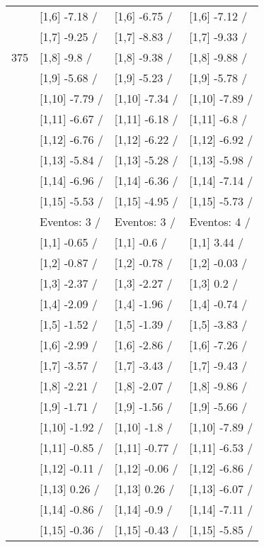 \begin{table}
\begin{tabular}[t]{llll}
 & {}[1,6] -7.18  / & {}[1,6] -6.75  / & {}[1,6] -7.12  /\\
 & {}[1,7] -9.25  / & {}[1,7] -8.83  / & {}[1,7] -9.33  /\\
375 & {}[1,8] -9.8  / & {}[1,8] -9.38  / & {}[1,8] -9.88  /\\
\addlinespace
 & {}[1,9] -5.68  / & {}[1,9] -5.23  / & {}[1,9] -5.78  /\\
 & {}[1,10] -7.79  / & {}[1,10] -7.34  / & {}[1,10] -7.89  /\\
 & {}[1,11] -6.67  / & {}[1,11] -6.18  / & {}[1,11] -6.8  /\\
 & {}[1,12] -6.76  / & {}[1,12] -6.22  / & {}[1,12] -6.92  /\\
 & {}[1,13] -5.84  / & {}[1,13] -5.28  / & {}[1,13] -5.98  /\\
\addlinespace
 & {}[1,14] -6.96  / & {}[1,14] -6.36  / & {}[1,14] -7.14  /\\
 & {}[1,15] -5.53  / & {}[1,15] -4.95  / & {}[1,15] -5.73  /\\
 & Eventos:  3 / & Eventos:  3 / & Eventos:  4 /\\
 & {}[1,1] -0.65  / & {}[1,1] -0.6  / & {}[1,1] 3.44  /\\
 & {}[1,2] -0.87  / & {}[1,2] -0.78  / & {}[1,2] -0.03  /\\
\addlinespace
 & {}[1,3] -2.37  / & {}[1,3] -2.27  / & {}[1,3] 0.2  /\\
 & {}[1,4] -2.09  / & {}[1,4] -1.96  / & {}[1,4] -0.74  /\\
 & {}[1,5] -1.52  / & {}[1,5] -1.39  / & {}[1,5] -3.83  /\\
 & {}[1,6] -2.99  / & {}[1,6] -2.86  / & {}[1,6] -7.26  /\\
 & {}[1,7] -3.57  / & {}[1,7] -3.43  / & {}[1,7] -9.43  /\\
\addlinespace
500 & {}[1,8] -2.21  / & {}[1,8] -2.07  / & {}[1,8] -9.86  /\\
 & {}[1,9] -1.71  / & {}[1,9] -1.56  / & {}[1,9] -5.66  /\\
 & {}[1,10] -1.92  / & {}[1,10] -1.8  / & {}[1,10] -7.89  /\\
 & {}[1,11] -0.85  / & {}[1,11] -0.77  / & {}[1,11] -6.53  /\\
 & {}[1,12] -0.11  / & {}[1,12] -0.06  / & {}[1,12] -6.86  /\\
\addlinespace
 & {}[1,13] 0.26  / & {}[1,13] 0.26  / & {}[1,13] -6.07  /\\
 & {}[1,14] -0.86  / & {}[1,14] -0.9  / & {}[1,14] -7.11  /\\
 & {}[1,15] -0.36  / & {}[1,15] -0.43  / & {}[1,15] -5.85  /\\
\bottomrule
\end{tabular}
\end{table}

